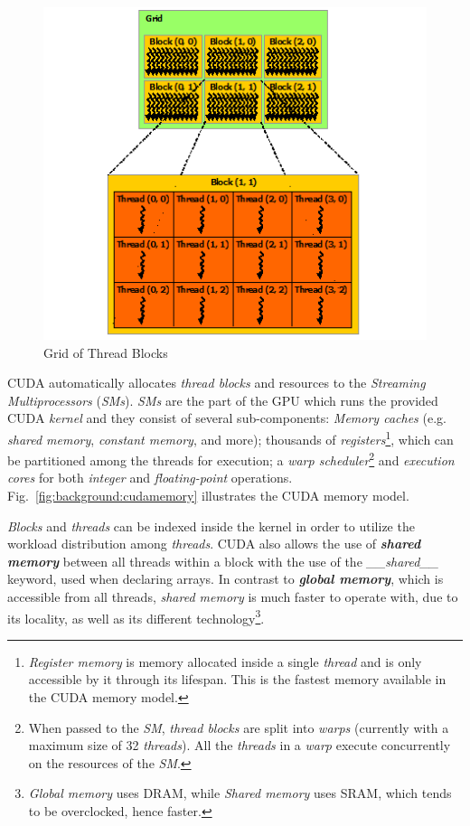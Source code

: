 \begin{figure}[H]
	\centering
	\includegraphics[width=.9\textwidth]{img/gridblockthread.png}
	\caption{Grid of Thread Blocks}
	\label{fig:background:gridblockthread}
\end{figure}

CUDA automatically allocates \textit{thread blocks} and resources to the \textit{Streaming Multiprocessors} (\textit{SMs}). \textit{SMs} are the part of the GPU which runs the provided CUDA \textit{kernel} and they consist of several sub-components: \textit{Memory caches} (e.g. \textit{shared memory}, \textit{constant memory}, and more); thousands of \textit{registers}\footnote{\textit{Register memory} is memory allocated inside a single \textit{thread} and is only accessible by it through its lifespan. This is the fastest memory available in the CUDA memory model.}, which can be partitioned among the threads for execution; a \textit{warp scheduler}\footnote{When passed to the \textit{SM}, \textit{thread blocks} are split into \textit{warps} (currently with a maximum size of 32 \textit{threads}). All the \textit{threads} in a \textit{warp} execute concurrently on the resources of the \textit{SM}.} and \textit{execution cores} for both \textit{integer} and \textit{floating-point} operations. Fig.~\ref{fig:background:cudamemory} illustrates the CUDA memory model. 

\textit{Blocks} and \textit{threads} can be indexed inside the kernel in order to utilize the workload distribution among \textit{threads}. CUDA also allows the use of \textbf{\textit{shared memory}} between all threads within a block with the use of the \textit{\_\_shared\_\_} keyword, used when declaring arrays. In contrast to \textbf{\textit{global memory}}, which is accessible from all threads, \textit{shared memory} is much faster to operate with, due to its locality, as well as its different technology\footnote{\textit{Global memory} uses DRAM, while \textit{Shared memory} uses SRAM, which tends to be overclocked, hence faster.}.

